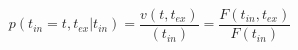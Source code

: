 \begin{equation}
p(t_{in}=t,t_{ex}|t_{in})  = \frac{v(t,t_{ex})}{(t_{in})}= \frac{F(t_{in},t_{ex})}{F(t_{in})}
\end{equation}